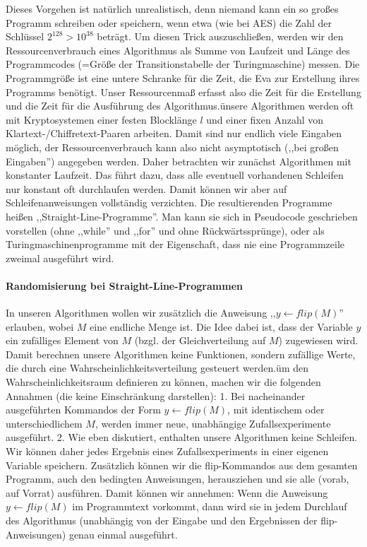\documentclass[a4paper]{article}
\begin{document}
\begin{multicols}{3}
    Dieses Vorgehen ist natürlich unrealistisch, denn niemand kann ein so großes Programm schreiben oder speichern, wenn etwa (wie bei AES) die Zahl der Schlüssel $2^{128}>10^{38}$ beträgt. Um diesen Trick auszuschließen, werden wir den Ressourcenverbrauch eines Algorithmus als Summe von Laufzeit und Länge des Programmcodes (=Größe der Transitionstabelle der Turingmaschine) messen. Die Programmgröße ist eine untere Schranke für die Zeit, die Eva zur Erstellung ihres Programms benötigt. Unser Ressourcenmaß erfasst also die Zeit für die Erstellung und die Zeit für die Ausführung des Algorithmus.ünsere Algorithmen werden oft mit Kryptosystemen einer festen Blocklänge $l$ und einer fixen Anzahl von Klartext-/Chiffretext-Paaren arbeiten. Damit sind nur endlich viele Eingaben möglich, der Ressourcenverbrauch kann also nicht asymptotisch (,,bei großen Eingaben'') angegeben werden. Daher betrachten wir zunächst Algorithmen mit konstanter Laufzeit. Das führt dazu, dass alle eventuell vorhandenen Schleifen nur konstant oft durchlaufen werden. Damit können wir aber auf Schleifenanweisungen vollständig verzichten. Die resultierenden Programme heißen ,,Straight-Line-Programme''. Man kann sie sich in Pseudocode geschrieben vorstellen (ohne ,,while'' und ,,for'' und ohne Rückwärtssprünge), oder als Turingmaschinenprogramme mit der Eigenschaft, dass nie eine Programmzeile zweimal ausgeführt wird.

    \paragraph{Randomisierung bei Straight-Line-Programmen}
    In unseren Algorithmen wollen wir zusätzlich die Anweisung ,,$y\leftarrow flip(M)$'' erlauben, wobei $M$ eine endliche Menge ist. Die Idee dabei ist, dass der Variable $y$ ein zufälliges Element von $M$ (bzgl. der Gleichverteilung auf $M$) zugewiesen wird. Damit berechnen unsere Algorithmen keine Funktionen, sondern zufällige Werte, die durch eine Wahrscheinlichkeitsverteilung gesteuert werden.üm den Wahrscheinlichkeitsraum definieren zu können, machen wir die folgenden Annahmen (die keine Einschränkung darstellen):
    1. Bei nacheinander ausgeführten Kommandos der Form $y\leftarrow flip(M)$, mit identischem oder unterschiedlichem $M$, werden immer neue, unabhängige Zufallsexperimente ausgeführt.
    2. Wie eben diskutiert, enthalten unsere Algorithmen keine Schleifen. Wir können daher jedes Ergebnis eines Zufallsexperiments in einer eigenen Variable speichern. Zusätzlich können wir die flip-Kommandos aus dem gesamten Programm, auch den bedingten Anweisungen, herausziehen und sie alle (vorab, auf Vorrat) ausführen. Damit können wir annehmen: Wenn die Anweisung $y\leftarrow flip(M)$ im Programmtext vorkommt, dann wird sie in jedem Durchlauf des Algorithmus (unabhängig von der Eingabe und den Ergebnissen der flip-Anweisungen) genau einmal ausgeführt.


\end{multicols}
\end{document}
